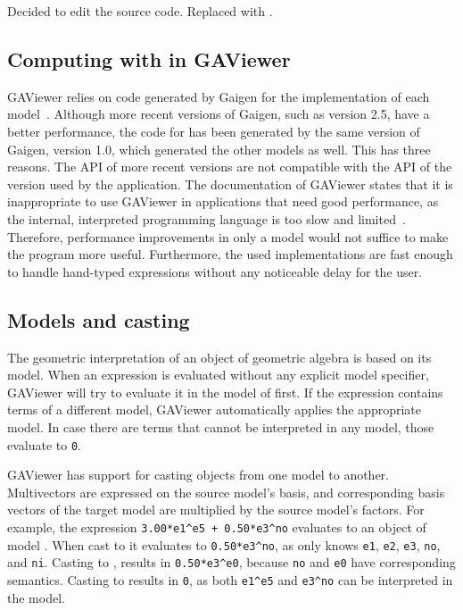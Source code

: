 Decided to edit the source code.  Replaced \iga{} with \lga{}. 

\subsection{Computing with \lga{} in GAViewer}
GAViewer relies on code generated by Gaigen for the implementation of each model~\cite{Gaigen}.  Although more recent versions of Gaigen, such as version 2.5, have a better performance, the code for \lga{} has been generated by the same version of Gaigen, version 1.0, which generated the other models as well.  This has three reasons.  The API of more recent versions are not compatible with the API of the version used by the application.  The documentation of GAViewer states that it is inappropriate to use GAViewer in applications that need good performance, as the internal, interpreted programming language is too slow and limited~\cite[page 7]{GAViewer}.  Therefore, performance improvements in only a model would not suffice to make the program more useful.  Furthermore, the used implementations are fast enough to handle hand-typed expressions without any noticeable delay for the user.

\subsection{Models and casting}
The geometric interpretation of an object of geometric algebra is based on its model.  When an expression is evaluated without any explicit model specifier, GAViewer will try to evaluate it in the model of \ega{} first.  If the expression contains terms of a different model, GAViewer automatically applies the appropriate model.  In case there are terms that cannot be interpreted in any model, those evaluate to \texttt{0}.

GAViewer has support for casting objects from one model to another.  Multivectors are expressed on the source model's basis, and corresponding basis vectors of the target model are multiplied by the source model's factors.  For example, the expression \texttt{3.00*e1\^{}e5 + 0.50*e3\^{}no} evaluates to an object of model \cbga{}.  When cast to \cga{} it evaluates to \texttt{0.50*e3\^{}no}, as \cga{} only knows \texttt{e1}, \texttt{e2}, \texttt{e3}, \texttt{no}, and \texttt{ni}.  Casting to \pga{}, results in \texttt{0.50*e3\^{}e0}, because \texttt{no} and \texttt{e0} have corresponding semantics.  Casting to \ega{} results in \texttt{0}, as both \texttt{e1\^{}e5} and \texttt{e3\^{}no} can be interpreted in the model.

